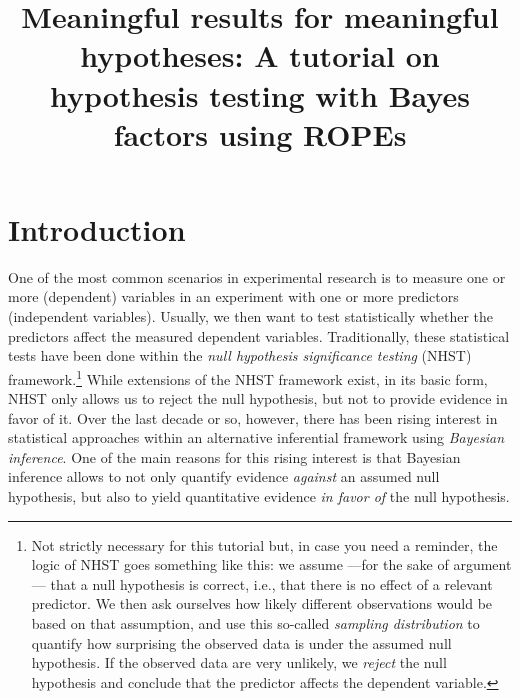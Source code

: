\documentclass[
  doc,
  floatsintext,
  longtable,
  nolmodern,
  notxfonts,
  notimes,
  colorlinks=true,linkcolor=blue,citecolor=blue,urlcolor=blue]{apa7}
\title{Meaningful results for meaningful hypotheses: A tutorial on
hypothesis testing with Bayes factors using ROPEs}
\begin{document}
\maketitle



\setcounter{secnumdepth}{3}

\setlength\LTleft{0pt}




\section{Introduction}\label{introduction}

One of the most common scenarios in experimental research is to measure
one or more (dependent) variables in an experiment with one or more
predictors (independent variables). Usually, we then want to test
statistically whether the predictors affect the measured dependent
variables. Traditionally, these statistical tests have been done within
the \emph{null hypothesis significance testing} (NHST)
framework.\footnote{Not strictly necessary for this tutorial but, in
  case you need a reminder, the logic of NHST goes something like this:
  we assume ---for the sake of argument--- that a null hypothesis is
  correct, i.e., that there is no effect of a relevant predictor. We
  then ask ourselves how likely different observations would be based on
  that assumption, and use this so-called \emph{sampling distribution}
  to quantify how surprising the observed data is under the assumed null
  hypothesis. If the observed data are very unlikely, we \emph{reject}
  the null hypothesis and conclude that the predictor affects the
  dependent variable.} While extensions of the NHST framework exist, in
its basic form, NHST only allows us to reject the null hypothesis, but
not to provide evidence in favor of it. Over the last decade or so,
however, there has been rising interest in statistical approaches within
an alternative inferential framework using \emph{Bayesian inference}.
One of the main reasons for this rising interest is that Bayesian
inference allows to not only quantify evidence \emph{against} an assumed
null hypothesis, but also to yield quantitative evidence \emph{in favor
of} the null hypothesis.
\end{document}
